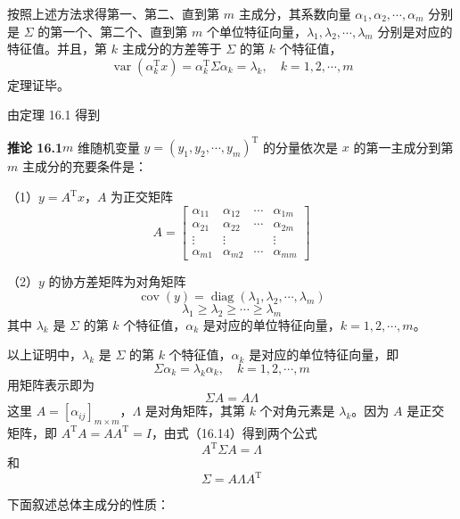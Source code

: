 \documentclass[UTF8, 12pt, fontset=fandol, oneside]{ctexart}
\begin{document}
按照上述方法求得第一、第二、直到第 $m$ 主成分，其系数向量 $\alpha_1,\alpha_2,\cdots,\alpha_m$ 分别是 $\Sigma$ 的第一个、第二个、直到第 $m$ 个单位特征向量，$\lambda_1,\lambda_2,\cdots,\lambda_m$ 分别是对应的特征值。并且，第 $k$ 主成分的方差等于 $\Sigma$ 的第 $k$ 个特征值，
\begin{equation}
\operatorname{var}(\alpha_k^{\mathrm{T}}x)=\alpha_k^{\mathrm{T}}\Sigma\alpha_k=\lambda_k,\quad k=1,2,\cdots,m
\tag{16.12}
\end{equation}
定理证毕。

由定理 16.1 得到

\noindent\textbf{推论 16.1}\quad $m$ 维随机变量 $y=(y_1,y_2,\cdots,y_m)^{\mathrm{T}}$ 的分量依次是 $x$ 的第一主成分到第 $m$ 主成分的充要条件是：

（1）$y=A^{\mathrm{T}}x$，$A$ 为正交矩阵
\[
A=
\begin{bmatrix}
\alpha_{11} & \alpha_{12} & \cdots & \alpha_{1m}\\
\alpha_{21} & \alpha_{22} & \cdots & \alpha_{2m}\\
\vdots & \vdots & & \vdots\\
\alpha_{m1} & \alpha_{m2} & \cdots & \alpha_{mm}
\end{bmatrix}
\]

（2）$y$ 的协方差矩阵为对角矩阵
\[
\operatorname{cov}(y)=\operatorname{diag}(\lambda_1,\lambda_2,\cdots,\lambda_m)
\]
\[
\lambda_1\geqslant\lambda_2\geqslant\cdots\geqslant\lambda_m
\]
其中 $\lambda_k$ 是 $\Sigma$ 的第 $k$ 个特征值，$\alpha_k$ 是对应的单位特征向量，$k=1,2,\cdots,m$。

以上证明中，$\lambda_k$ 是 $\Sigma$ 的第 $k$ 个特征值，$\alpha_k$ 是对应的单位特征向量，即
\begin{equation}
\Sigma\alpha_k=\lambda_k\alpha_k,\quad k=1,2,\cdots,m
\tag{16.13}
\end{equation}
用矩阵表示即为
\begin{equation}
\Sigma A=A\Lambda
\tag{16.14}
\end{equation}
这里 $A=[\alpha_{ij}]_{m\times m}$，$\Lambda$ 是对角矩阵，其第 $k$ 个对角元素是 $\lambda_k$。因为 $A$ 是正交矩阵，即 $A^{\mathrm{T}}A=AA^{\mathrm{T}}=I$，由式（16.14）得到两个公式
\begin{equation}
A^{\mathrm{T}}\Sigma A=\Lambda
\tag{16.15}
\end{equation}
和
\begin{equation}
\Sigma=A\Lambda A^{\mathrm{T}}
\tag{16.16}
\end{equation}

下面叙述总体主成分的性质：
\end{document}
